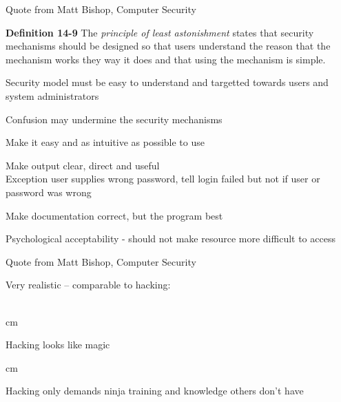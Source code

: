 \documentclass[Screen16to9,17pt]{foils}
\begin{document}
Quote from Matt Bishop, Computer Security



\begin{list1}
\item {\bf Definition 14-9} The \emph{principle of least astonishment} states that security mechanisms should be designed so that users understand the reason that the mechanism works they way it does and that using the mechanism is simple.
\item Security model must be easy to understand and targetted towards users and system administrators
\item Confusion may undermine the security mechanisms
\item Make it easy and as intuitive as possible to use
\item Make output clear, direct and useful\\
Exception user supplies wrong password, tell login failed but not if user or password was wrong
\item Make documentation correct, but the program best
\item Psychological acceptability - should not make resource more difficult to access
\end{list1}

Quote from Matt Bishop, Computer Security







Very realistic -- comparable to hacking:\\
\\





 cm

\centerline{Hacking looks like magic}




 cm
\centerline{Hacking only demands ninja training and knowledge others don't have}
\end{document}
